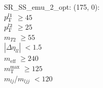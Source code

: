 SR\_SS\_emu\_2\_opt: (175, 0): \\
$p_{\text{T}}^{l1}$ $\geq 45$ \\
$p_{\text{T}}^{l2}$ $\geq 25$ \\
$m_{T2}$ $\geq 55$ \\
$|\Delta\eta_{ll}|$ $<1.5$ \\
$m_{\text{eff}}$ $\geq 240$ \\
$m_{\text{T}}^{\text{max}}$ $\geq 125$ \\
$m_{lj}$/$m_{ljj}$ $<120$ \\
